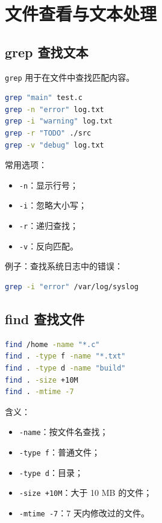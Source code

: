 \documentclass[UTF8,a4paper,12pt]{ctexart}
\begin{document}
\section{文件查看与文本处理}

\subsection{grep 查找文本}

\texttt{grep} 用于在文件中查找匹配内容。

\begin{lstlisting}[language=bash]
grep "main" test.c
grep -n "error" log.txt
grep -i "warning" log.txt
grep -r "TODO" ./src
grep -v "debug" log.txt
\end{lstlisting}

常用选项：
\begin{itemize}
    \item \texttt{-n}：显示行号；
    \item \texttt{-i}：忽略大小写；
    \item \texttt{-r}：递归查找；
    \item \texttt{-v}：反向匹配。
\end{itemize}

例子：查找系统日志中的错误：

\begin{lstlisting}[language=bash]
grep -i "error" /var/log/syslog
\end{lstlisting}

\subsection{find 查找文件}

\begin{lstlisting}[language=bash]
find /home -name "*.c"
find . -type f -name "*.txt"
find . -type d -name "build"
find . -size +10M
find . -mtime -7
\end{lstlisting}

含义：
\begin{itemize}
    \item \texttt{-name}：按文件名查找；
    \item \texttt{-type f}：普通文件；
    \item \texttt{-type d}：目录；
    \item \texttt{-size +10M}：大于 10 MB 的文件；
    \item \texttt{-mtime -7}：7 天内修改过的文件。
\end{itemize}
\end{document}
